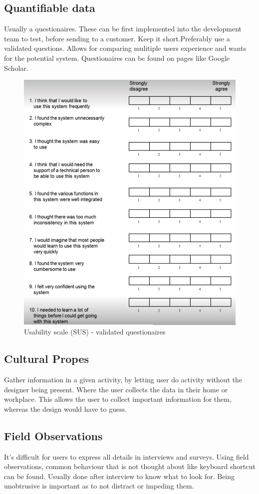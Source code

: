 \subsection*{Quantifiable data}
Usually a questionaires. These can be first implemented into the development team to test, before sending to a customer. Keep it short.Preferably use a validated questions. Allows for comparing mulitiple users experience and wants for the potential system. Questionaires can be found on pages like Google Scholar.

\begin{figure}[H]
    \begin{center}
        \includegraphics*[width=\linewidth*3/4]{chapters/data_collection/figures/sus_scale.png}        
    \end{center}
    \caption{Usability scale (SUS) - validated questionaires}
    \label{fig:sus}
\end{figure}

\subsection*{Cultural Propes}
Gather information in a given activity, by letting user do activity without the designer being present. Where the user collects the data in their home or workplace. This allows the user to collect important information for them, whereas the design would have to guess.

\subsection*{Field Observations}
It's difficult for users to express all details in interviews and surveys. Using field observations, common behaviour that is not thought about like keyboard shortcut can be found. Usually done after interview to know what to look for. Being unobtrusive is important as to not distract or impeding them.